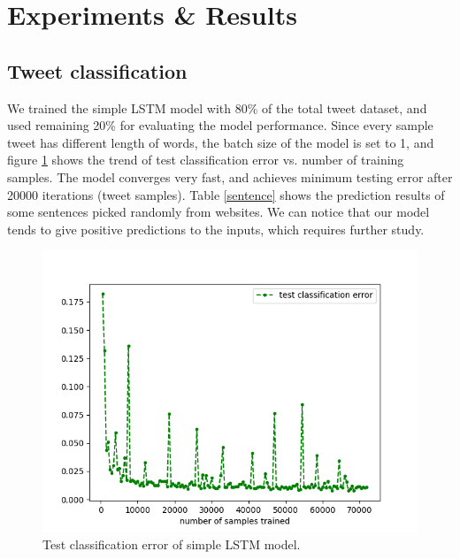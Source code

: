 \documentclass{article}
\begin{document}
\section{Experiments \& Results}
\subsection{Tweet classification}

We trained the simple LSTM model with 80\% of the total tweet dataset, and used remaining 20\% for evaluating the model performance. Since every sample tweet has different length of words, the batch size of the model is set to 1, and figure \ref{fig:test error} shows the trend of test classification error vs. number of training samples. The model converges very fast, and achieves minimum testing error after 20000 iterations (tweet samples). Table \ref{sentence} shows the prediction results of some sentences picked randomly from websites. We can notice that our model tends to give positive predictions to the inputs, which requires further study. 




\begin{figure}
\begin{center}
\includegraphics[scale=0.6]{Figure2.png}
\caption{Test classification error of simple LSTM model.}
\label{fig:test error}
\end{center}
\end{figure}
\end{document}
